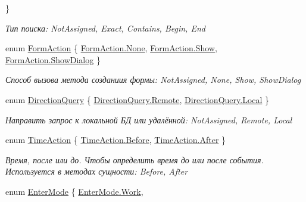 \begin{DoxyCompactItemize}
 \}
\begin{DoxyCompactList}\small\item\em Тип поиска\+: Not\+Assigned, Exact, Contains, Begin, End \end{DoxyCompactList}\item 
enum \mbox{\hyperlink{namespace_f_b_a_aadfe3a0963c89fed76f70b1241bb7b2b}{Form\+Action}} \{ \mbox{\hyperlink{namespace_f_b_a_aadfe3a0963c89fed76f70b1241bb7b2ba6adf97f83acf6453d4a6a4b1070f3754}{Form\+Action.\+None}}, 
\mbox{\hyperlink{namespace_f_b_a_aadfe3a0963c89fed76f70b1241bb7b2ba498f79c4c5bbde77f1bceb6c86fd0f6d}{Form\+Action.\+Show}}, 
\mbox{\hyperlink{namespace_f_b_a_aadfe3a0963c89fed76f70b1241bb7b2ba6aeee0666925716cc20b7b4f4936e003}{Form\+Action.\+Show\+Dialog}}
 \}
\begin{DoxyCompactList}\small\item\em Способ вызова метода созданиия формы\+: Not\+Assigned, None, Show, Show\+Dialog \end{DoxyCompactList}\item 
enum \mbox{\hyperlink{namespace_f_b_a_a6ff7d5c242d98046d1980715b06d7300}{Direction\+Query}} \{ \mbox{\hyperlink{namespace_f_b_a_a6ff7d5c242d98046d1980715b06d7300af8508f576cd3f742dfc268258dcdf0dd}{Direction\+Query.\+Remote}}, 
\mbox{\hyperlink{namespace_f_b_a_a6ff7d5c242d98046d1980715b06d7300a509820290d57f333403f490dde7316f4}{Direction\+Query.\+Local}}
 \}
\begin{DoxyCompactList}\small\item\em Направить запрос к локальной БД или удалённой\+: Not\+Assigned, Remote, Local \end{DoxyCompactList}\item 
enum \mbox{\hyperlink{namespace_f_b_a_a8f6da5d8d2dd8766bfe9052175a21970}{Time\+Action}} \{ \mbox{\hyperlink{namespace_f_b_a_a8f6da5d8d2dd8766bfe9052175a21970a9060587edeb01a63e3d3edc959678d1e}{Time\+Action.\+Before}}, 
\mbox{\hyperlink{namespace_f_b_a_a8f6da5d8d2dd8766bfe9052175a21970a7bfcadb5535fe8aad5032762b7bfe159}{Time\+Action.\+After}}
 \}
\begin{DoxyCompactList}\small\item\em Время, после или до. Чтобы определить время до или после события. Используется в методах сущности\+: Before, After \end{DoxyCompactList}\item 
enum \mbox{\hyperlink{namespace_f_b_a_ae06257c0c200c35284fec536bf589744}{Enter\+Mode}} \{ \mbox{\hyperlink{namespace_f_b_a_ae06257c0c200c35284fec536bf589744a0f9263536b9fc61ada745644735bfd8f}{Enter\+Mode.\+Work}}, 

\end{DoxyCompactItemize}
